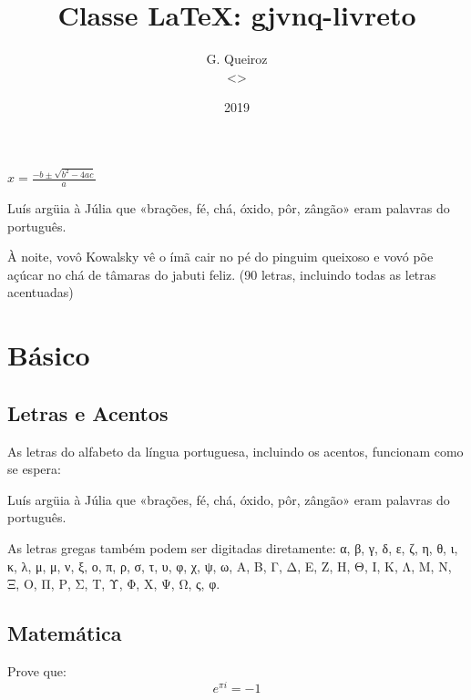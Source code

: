 \documentclass{gjvnq-livreto}
\title{Classe \LaTeX: gjvnq-livreto}
\author{G. Queiroz\\<\mailto{gabrieljvnq@gmail.com}>}
\date{2019}
\begin{document}
\maketitle

$x = \frac{-b \pm \sqrt{b^2 - 4ac}}{a}$

Luís argüia à Júlia que «brações, fé, chá, óxido, pôr, zângão» eram palavras do português.

À noite, vovô Kowalsky vê o ímã cair no pé do pinguim queixoso e vovó põe açúcar no chá de tâmaras do jabuti feliz. (90 letras, incluindo todas as letras acentuadas)


\chapter{Básico}

\section{Letras e Acentos}

As letras do alfabeto da língua portuguesa, incluindo os acentos, funcionam como se espera:

\begin{latexExample}
Luís argüia à Júlia que «brações, fé, chá, óxido, pôr, zângão» eram palavras do português.
\end{latexExample}

As letras gregas também podem ser digitadas diretamente: α, β, γ, δ, ε, ζ, η, θ, ι, κ, λ, μ, μ, ν, ξ, ο, π, ρ, σ, τ, υ, φ, χ, ψ, ω, Α, Β, Γ, Δ, Ε, Ζ, Η, Θ, Ι, Κ, Λ, Μ, Ν, Ξ, Ο, Π, Ρ, Σ, Τ, Υ, Φ, Χ, Ψ, Ω, ς, φ.

\section{Matemática}

\begin{latexExample}
Prove que:
\begin{equation}
e^{\pi i} = -1
\end{equation}
\end{latexExample}
\end{document}
